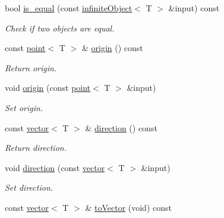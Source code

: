 \begin{DoxyCompactItemize}
bool \hyperlink{classddd_1_1infinite_object_a64089c7dadb2ec0b414b155f5bd43339}{is\+\_\+equal} (const \hyperlink{classddd_1_1infinite_object}{infinite\+Object}$<$ T $>$ \&input) const
\begin{DoxyCompactList}\small\item\em Check if two objects are equal. \end{DoxyCompactList}\item 
\mbox{\label{classddd_1_1infinite_object_a0097f1df7ea358d410a73bdfcf2904f9}} 
const \hyperlink{classddd_1_1point}{point}$<$ T $>$ \& \hyperlink{classddd_1_1infinite_object_a0097f1df7ea358d410a73bdfcf2904f9}{origin} () const
\begin{DoxyCompactList}\small\item\em Return origin. \end{DoxyCompactList}\item 
void \hyperlink{classddd_1_1infinite_object_a82ecd5fc09ecfe5b1fe9a2609dd1465e}{origin} (const \hyperlink{classddd_1_1point}{point}$<$ T $>$ \&input)
\begin{DoxyCompactList}\small\item\em Set origin. \end{DoxyCompactList}\item 
\mbox{\label{classddd_1_1infinite_object_a7197d400db3804be122c78475c242a00}} 
const \hyperlink{classddd_1_1vector}{vector}$<$ T $>$ \& \hyperlink{classddd_1_1infinite_object_a7197d400db3804be122c78475c242a00}{direction} () const
\begin{DoxyCompactList}\small\item\em Return direction. \end{DoxyCompactList}\item 
void \hyperlink{classddd_1_1infinite_object_a1940ac3d87fc2ca742ca036c866736e8}{direction} (const \hyperlink{classddd_1_1vector}{vector}$<$ T $>$ \&input)
\begin{DoxyCompactList}\small\item\em Set direction. \end{DoxyCompactList}\item 
\mbox{\label{classddd_1_1infinite_object_a7f5790458f0f4e5bb085b580ead9e862}} 
const \hyperlink{classddd_1_1vector}{vector}$<$ T $>$ \& \hyperlink{classddd_1_1infinite_object_a7f5790458f0f4e5bb085b580ead9e862}{to\+Vector} (void) const

\end{DoxyCompactItemize}
